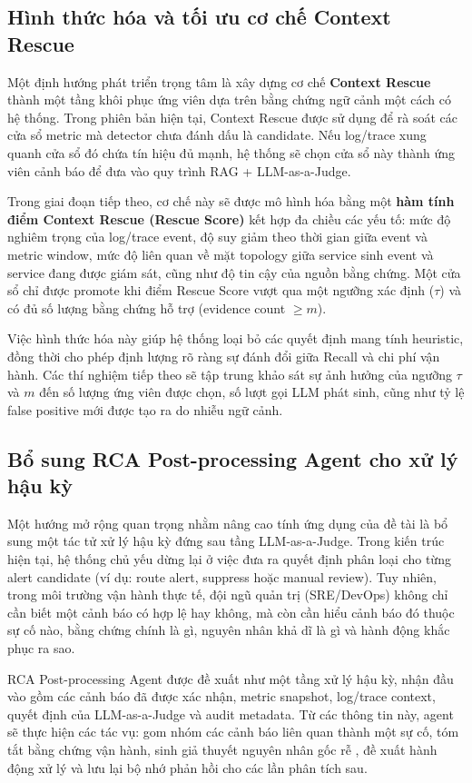 \subsection{Hình thức hóa và tối ưu cơ chế Context Rescue}

Một định hướng phát triển trọng tâm là xây dựng cơ chế \textbf{Context Rescue} thành một tầng khôi phục ứng viên dựa trên bằng chứng ngữ cảnh một cách có hệ thống. Trong phiên bản hiện tại, Context Rescue được sử dụng để rà soát các cửa sổ metric mà detector chưa đánh dấu là candidate. Nếu log/trace xung quanh cửa sổ đó chứa tín hiệu đủ mạnh, hệ thống sẽ chọn cửa sổ này thành ứng viên cảnh báo để đưa vào quy trình RAG + LLM-as-a-Judge.

Trong giai đoạn tiếp theo, cơ chế này sẽ được mô hình hóa bằng một \textbf{hàm tính điểm Context Rescue (Rescue Score)} kết hợp đa chiều các yếu tố: mức độ nghiêm trọng của log/trace event, độ suy giảm theo thời gian giữa event và metric window, mức độ liên quan về mặt topology giữa service sinh event và service đang được giám sát, cũng như độ tin cậy của nguồn bằng chứng. Một cửa sổ chỉ được promote khi điểm Rescue Score vượt qua một ngưỡng xác định ($\tau$) và có đủ số lượng bằng chứng hỗ trợ (evidence count $\ge m$).

Việc hình thức hóa này giúp hệ thống loại bỏ các quyết định mang tính heuristic, đồng thời cho phép định lượng rõ ràng sự đánh đổi giữa Recall và chi phí vận hành. Các thí nghiệm tiếp theo sẽ tập trung khảo sát sự ảnh hưởng của ngưỡng $\tau$ và $m$ đến số lượng ứng viên được chọn, số lượt gọi LLM phát sinh, cũng như tỷ lệ false positive mới được tạo ra do nhiễu ngữ cảnh.

\subsection{Bổ sung RCA Post-processing Agent cho xử lý hậu kỳ}

Một hướng mở rộng quan trọng nhằm nâng cao tính ứng dụng của đề tài là bổ sung một tác tử xử lý hậu kỳ đứng sau tầng LLM-as-a-Judge. Trong kiến trúc hiện tại, hệ thống chủ yếu dừng lại ở việc đưa ra quyết định phân loại cho từng alert candidate (ví dụ: route alert, suppress hoặc manual review). Tuy nhiên, trong môi trường vận hành thực tế, đội ngũ quản trị (SRE/DevOps) không chỉ cần biết một cảnh báo có hợp lệ hay không, mà còn cần hiểu cảnh báo đó thuộc sự cố nào, bằng chứng chính là gì, nguyên nhân khả dĩ là gì và hành động khắc phục ra sao.

RCA Post-processing Agent được đề xuất như một tầng xử lý hậu kỳ, nhận đầu vào gồm các cảnh báo đã được xác nhận, metric snapshot, log/trace context, quyết định của LLM-as-a-Judge và audit metadata. Từ các thông tin này, agent sẽ thực hiện các tác vụ: gom nhóm các cảnh báo liên quan thành một sự cố, tóm tắt bằng chứng vận hành, sinh giả thuyết nguyên nhân gốc rễ , đề xuất hành động xử lý và lưu lại bộ nhớ phản hồi cho các lần phân tích sau.

